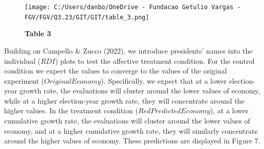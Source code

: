 \documentclass[
]{article}
\begin{document}
\begin{figure}
\centering
\texttt{[image: C:/Users/danbo/OneDrive - Fundacao Getulio Vargas - FGV/FGV/Q3.23/GIT/GIT/table\_3.png]}
\caption{\textbf{Table 3}}
\end{figure}

Building on Campello \& Zucco (2022), we introduce presidents' names
into the individual (\(RDI\)) plots to test the affective treatment
condition. For the control condition we expect the values to converge to
the values of the original experiment (\(Original Economy\)).
Specifically, we expect that at a lower election-year growth rate, the
evaluations will cluster around the lower values of economy, while at a
higher election-year growth rate, they will concentrate around the
higher values. In the treatment condition (\(Red Predicted Economy\)),
at a lower cumulative growth rate, the evaluations will cluster around
the lower values of economy, and at a higher cumulative growth rate,
they will similarly concentrate around the higher values of economy.
These predictions are displayed in Figure 7.
\end{document}

